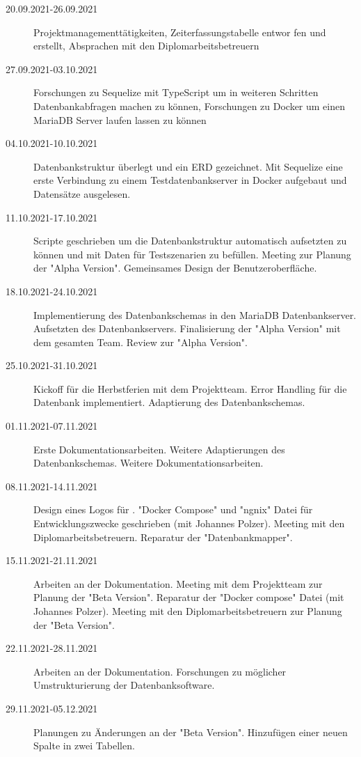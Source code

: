 
\begin{description}
    \item[20.09.2021-26.09.2021] Projektmanagementtätigkeiten, Zeiterfassungstabelle entwor\- \newline fen und erstellt, Absprachen mit den Diplomarbeitsbetreuern
    \item[27.09.2021-03.10.2021] Forschungen zu Sequelize mit TypeScript um in weiteren Schritten Datenbankabfragen machen zu können, Forschungen zu Docker um einen MariaDB Server laufen lassen zu können
    \item[04.10.2021-10.10.2021] Datenbankstruktur überlegt und ein ERD gezeichnet. Mit Sequelize eine erste Verbindung zu einem Testdatenbankserver in Docker aufgebaut und Datensätze ausgelesen.
    \item[11.10.2021-17.10.2021] Scripte geschrieben um die Datenbankstruktur automatisch aufsetzten zu können und mit Daten für Testszenarien zu befüllen. Meeting zur Planung der "Alpha Version". Gemeinsames Design der Benutzeroberfläche.
    \item[18.10.2021-24.10.2021] Implementierung des Datenbankschemas in den MariaDB \linebreak Datenbankserver. Aufsetzten des Datenbankservers. Finalisierung der "Alpha Version" mit dem gesamten Team. Review zur "Alpha Version".
    \item[25.10.2021-31.10.2021] Kickoff für die Herbstferien mit dem Projektteam. Error\- Handling für die Datenbank implementiert. Adaptierung des Datenbankschemas.
    \item[01.11.2021-07.11.2021] Erste Dokumentationsarbeiten. Weitere Adaptierungen des Datenbankschemas. Weitere Dokumentationsarbeiten.
    \item[08.11.2021-14.11.2021] Design eines Logos für \ZELIA. "Docker Compose" und "ngnix" Datei für Entwicklungszwecke geschrieben (mit Johannes Polzer). Meeting mit den Diplomarbeitsbetreuern. Reparatur der "Datenbankmapper". 
    \item[15.11.2021-21.11.2021] Arbeiten an der Dokumentation. Meeting mit dem Projektteam zur Planung der "Beta Version". Reparatur der "Docker compose" Datei (mit Johannes Polzer). Meeting mit den Diplomarbeitsbetreuern zur Planung der "Beta Version".  
    \item[22.11.2021-28.11.2021] Arbeiten an der Dokumentation. Forschungen zu möglicher Umstrukturierung der Datenbanksoftware.
    \item[29.11.2021-05.12.2021] Planungen zu Änderungen an der "Beta Version". Hinzufügen einer neuen Spalte in zwei Tabellen. 

\end{description}
